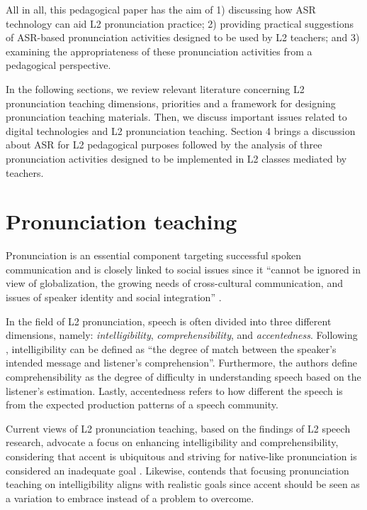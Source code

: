 \documentclass[english]{textolivre}
\begin{document}
All in all, this pedagogical paper has the aim of 1) discussing how ASR
technology can aid L2 pronunciation practice; 2) providing practical
suggestions of ASR-based pronunciation activities designed to be used by
L2 teachers; and 3) examining the appropriateness of these pronunciation
activities from a pedagogical perspective.

In the following sections, we review relevant literature concerning L2
pronunciation teaching dimensions, priorities and a framework for
designing pronunciation teaching materials. Then, we discuss important
issues related to digital technologies and L2 pronunciation teaching.
Section 4 brings a discussion about ASR for L2 pedagogical purposes
followed by the analysis of three pronunciation activities designed to
be implemented in L2 classes mediated by teachers.


\section{Pronunciation teaching}\label{pronunciation-teaching}

Pronunciation is an essential component
targeting successful spoken communication \cite{pennington2019} and
is closely linked to social issues since it ``cannot be ignored in view
of globalization, the growing needs of cross-cultural communication, and
issues of speaker identity and social integration'' \cite[p.~213]{chun2020}.

In the field of L2 pronunciation, speech is often divided into three
different dimensions, namely: \emph{intelligibility},
\emph{comprehensibility}, and \emph{accentedness}. Following \textcite[p.~5]{derwing2015}, intelligibility can be defined as ``the degree of
match between the speaker's intended message and listener's
comprehension''. Furthermore, the authors define comprehensibility as
the degree of difficulty in understanding speech based on the listener's
estimation. Lastly, accentedness refers to how different the speech is
from the expected production patterns of a speech community.

Current views of L2 pronunciation teaching, based on the findings of L2
speech research, advocate a focus on enhancing intelligibility and
comprehensibility, considering that accent is ubiquitous and striving
for native-like pronunciation is considered an inadequate goal
\cite{obrien2018}. Likewise, \textcite{levis2020} contends that focusing
pronunciation teaching on intelligibility aligns with realistic goals
since accent should be seen as a variation to embrace instead of a
problem to overcome.
\end{document}
